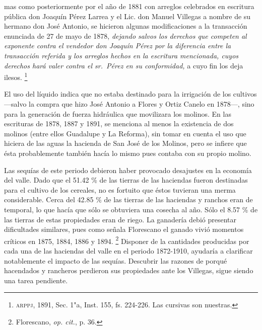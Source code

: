 \documentclass[14pt,twoside,final]{extbook} %
\let\oldfootnote\footnote
\renewcommand\footnote[1]{%
\oldfootnote{\hspace{1mm}#1}}
\begin{document}
\begin{quoting}
mas como posteriormente por el año de 1881 con arreglos celebrados en escritura pública don Joaquín Pérez Larrea y el Lic. don Manuel Villegas a nombre de su hermano don José Antonio, se hicieron algunas modificaciones a la transacción enunciada de 27 de mayo de 1878, \emph{dejando salvos los derechos que competen al exponente contra el vendedor don Joaquín Pérez por la diferencia entre la transacción referida y los arreglos hechos en la escritura mencionada, cuyos derechos hará valer contra el sr.~Pérez en su conformidad,} a cuyo fin los deja ilesos.\footnote{\textsc{arppj}, 1891, Sec. 1"a, Inst. 155, fs. 224-226. Las cursivas son nuestras.}
\end{quoting}
El uso del líquido indica que no estaba destinado para la irrigación de los cultivos ---salvo la compra que hizo José Antonio a Flores y Ortiz Canelo en 1878---, sino para la generación de fuerza hidráulica que movilizara los molinos. En las escrituras de 1878, 1887 y 1891, se menciona al menos la existencia de dos molinos (entre ellos Guadalupe y La Reforma), sin tomar en cuenta el uso que hiciera de las aguas la hacienda de San José de los Molinos, pero se infiere que ésta probablemente
también hacía lo mismo pues contaba con su propio molino.

Las sequías de este periodo debieron haber provocado desajustes en la economía del valle. Dado que el 51.42 \% de las tierras de las haciendas fueron destinadas para el cultivo de los cereales, no es fortuito que éstos tuvieran una merma considerable. Cerca del 42.85 \% de las tierras de las haciendas y ranchos eran de temporal, lo que hacía que sólo se obtuviera una cosecha al año. Sólo el 8.57 \% de las tierras de estas propiedades eran de riego. La ganadería debió presentar dificultades similares, pues como señala Florescano el ganado vivió momentos críticos en 1875, 1884, 1886 y 1894.\footnote{Florescano, \emph{op. cit.}, p. 36.} Disponer de la cantidades producidas por cada una de las haciendas del valle en el periodo 1872-1910, ayudaría a clarificar notablemente el impacto de las sequías. Descubrir las razones de porqué hacendados y rancheros perdieron sus propiedades ante los Villegas, sigue siendo una tarea pendiente.
\end{document}

